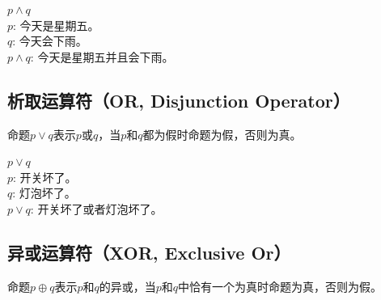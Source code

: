 \documentclass[12pt, openany, oneside]{book}
\begin{document}
\begin{tcolorbox}
	$ p \wedge q $\\
	$ p $: 今天是星期五。\\
	$ q $: 今天会下雨。\\
	$ p \wedge q $: 今天是星期五并且会下雨。
\end{tcolorbox}

\vspace{0.5cm}

\subsection{析取运算符（OR, Disjunction Operator）}

命题$ p \vee q $表示$ p $或$ q $，当$ p $和$ q $都为假时命题为假，否则为真。

\begin{table}[H]
	\centering
	\caption{OR真值表}
\end{table}

\begin{tcolorbox}
	$ p \vee q $\\
	$ p $: 开关坏了。\\
	$ q $: 灯泡坏了。\\
	$ p \vee q $: 开关坏了或者灯泡坏了。
\end{tcolorbox}

\vspace{0.5cm}

\subsection{异或运算符（XOR, Exclusive Or）}

命题$ p \oplus q $表示$ p $和$ q $的异或，当$ p $和$ q $中恰有一个为真时命题为真，否则为假。
\end{document}
